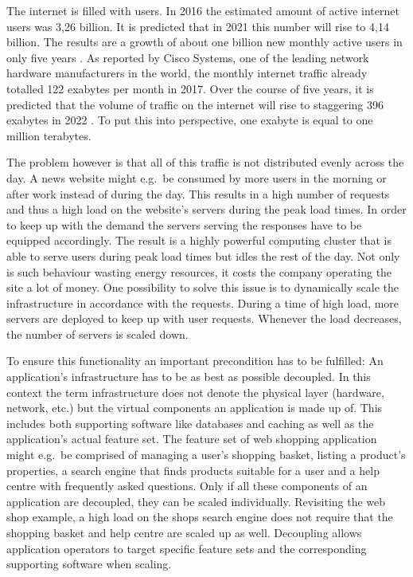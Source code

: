 
The internet is filled with users. In 2016 the estimated amount of active
internet users was 3,26 billion. It is predicted that in 2021 this number will
rise to 4,14 billion. The results are a growth of about one billion new monthly
active users in only five years
\autocite{eMarketerAnzahlderInternetnutzer2017}. As reported by Cisco Systems,
one of the leading network hardware manufacturers in the world, the monthly
internet traffic already totalled 122 exabytes per month in 2017. Over the
course of five years, it is predicted that the volume of traffic on the
internet will rise to staggering 396 exabytes in 2022
\autocite{SystemsDatenvolumendesglobalen2018}. To put this into perspective,
one exabyte is equal to one million terabytes.

The problem however is that all of this traffic is not distributed evenly
across the day. A news website might e.g.\ be consumed by more users in the
morning or after work instead of during the day. This results in a high number
of requests and thus a high load on the website's servers during the peak load
times. In order to keep up with the demand the servers serving the responses
have to be equipped accordingly. The result is a highly powerful computing
cluster that is able to serve users during peak load times but idles the rest
of the day. Not only is such behaviour wasting energy resources, it costs the
company operating the site a lot of money. One possibility to solve this issue
is to dynamically scale the infrastructure in accordance with the requests.
During a time of high load, more servers are deployed to keep up with user
requests. Whenever the load decreases, the number of servers is scaled down.

To ensure this functionality an important precondition has to be fulfilled: An
application's infrastructure has to be as best as possible decoupled. In this
context the term infrastructure does not denote the physical layer (hardware,
network, etc.) but the virtual components an application is made up of. This
includes both supporting software like databases and caching as well as the
application's actual feature set. The feature set of web shopping application
might e.g.\ be comprised of managing a user's shopping basket, listing a
product's properties, a search engine that finds products suitable for a
user and a help centre with frequently asked questions. Only if all these
components of an application are decoupled, they can be scaled individually.
Revisiting the web shop example, a high load on the shops search engine does
not require that the shopping basket and help centre are scaled up as well.
Decoupling allows application operators to target specific feature sets and the
corresponding supporting software when scaling.

